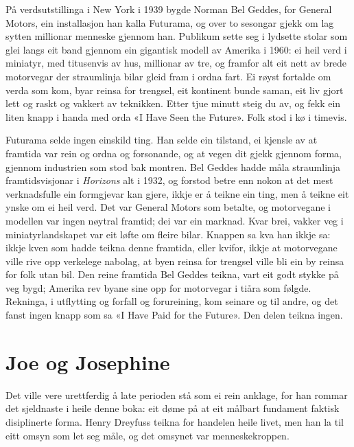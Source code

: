På verdsutstillinga i New York i 1939 bygde Norman Bel Geddes, for General Motors, ein installasjon han kalla Futurama, og over to sesongar gjekk om lag sytten millionar menneske gjennom han. Publikum sette seg i lydsette stolar som glei langs eit band gjennom ein gigantisk modell av Amerika i 1960: ei heil verd i miniatyr, med titusenvis av hus, millionar av tre, og framfor alt eit nett av brede motorvegar der straumlinja bilar gleid fram i ordna fart. Ei røyst fortalde om verda som kom, byar reinsa for trengsel, eit kontinent bunde saman, eit liv gjort lett og raskt og vakkert av teknikken. Etter tjue minutt steig du av, og fekk ein liten knapp i handa med orda «I Have Seen the Future». Folk stod i kø i timevis.

Futurama selde ingen einskild ting. Han selde ein tilstand, ei kjensle av at framtida var rein og ordna og forsonande, og at vegen dit gjekk gjennom forma, gjennom industrien som stod bak montren. Bel Geddes hadde måla straumlinja framtidsvisjonar i \emph{Horizons} alt i 1932, og forstod betre enn nokon at det mest verknadsfulle ein formgjevar kan gjere, ikkje er å teikne ein ting, men å teikne eit ynske om ei heil verd\autocite{geddes1932horizons}. Det var General Motors som betalte, og motorvegane i modellen var ingen nøytral framtid; dei var ein marknad. Kvar brei, vakker veg i miniatyrlandskapet var eit løfte om fleire bilar. Knappen sa kva han ikkje sa: ikkje kven som hadde teikna denne framtida, eller kvifor, ikkje at motorvegane ville rive opp verkelege nabolag, at byen reinsa for trengsel ville bli ein by reinsa for folk utan bil. Den reine framtida Bel Geddes teikna, vart eit godt stykke på veg bygd; Amerika rev byane sine opp for motorvegar i tiåra som følgde. Rekninga, i utflytting og forfall og forureining, kom seinare og til andre, og det fanst ingen knapp som sa «I Have Paid for the Future». Den delen teikna ingen.

\section{Joe og Josephine}

Det ville vere urettferdig å late perioden stå som ei rein anklage, for han rommar det sjeldnaste i heile denne boka: eit døme på at eit målbart fundament faktisk disiplinerte forma. Henry Dreyfuss teikna for handelen heile livet, men han la til eitt omsyn som let seg måle, og det omsynet var menneskekroppen.

